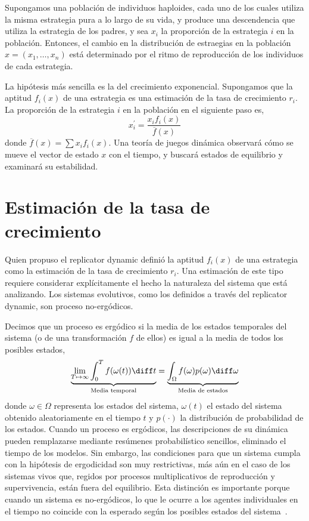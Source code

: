 \documentclass[a4paper,10pt]{article}
\begin{document}
Supongamos una población de individuos haploides, cada uno de los cuales utiliza la misma estrategia pura a lo largo de su vida, y produce una descendencia que utiliza la estrategia de los padres, y sea $x_i$ la proporción de la estrategia $i$ en la población.
Entonces, el cambio en la distribución de estraegias en la población $x = (x_1 , \dots , x_n)$ está determinado por el ritmo de reproducción de los individuos de cada estrategia.

La hipótesis más sencilla es la del crecimiento exponencial.
Supongamos que la aptitud $f_i(x)$ de una estrategia es una estimación de la tasa de crecimiento $r_i$.
La proporción de la estrategia $i$ en la población en el siguiente paso es,    
\begin{equation}
x_i^\prime = \frac{x_i f_i(x)}{\overline{f}(x)}
\end{equation}
donde $\overline{f}(x)=\sum x_i f_i(x)$.
Una teoría de juegos dinámica observará cómo se mueve el vector de estado $x$ con el tiempo, y buscará estados de equilibrio y examinará su estabilidad.

\section{Estimación de la tasa de crecimiento}

Quien propuso el replicator dynamic definió la aptitud $f_i(x)$ de una estrategia como la estimación de la tasa de crecimiento $r_i$.
Una estimación de este tipo requiere considerar explícitamente el hecho la naturaleza del sistema que está analizando. 
Los sistemas evolutivos, como los definidos a través del replicator dynamic, son proceso no-ergódicos.

Decimos que un proceso es ergódico si la media de los estados temporales del sistema (o de una transformación $f$ de ellos) es igual a la media de todos los posibles estados,
\begin{equation}
 \underbrace{\lim_{T \mapsto \infty} \int_0^T f(\omega(t)) \diff t}_{\text{Media temporal}}  = \underbrace{\int_{\Omega} f(\omega)p(\omega) \diff\omega}_{\text{Media de estados}}
\end{equation}
donde $\omega \in \Omega$ representa los estados del sistema, $\omega(t)$ el estado del sistema obtenido aleatoriamente en el tiempo $t$ y $p(\cdot)$ la distribución de probabilidad de los estados.
Cuando un proceso es ergódicos, las descripciones de su dinámica pueden remplazarse mediante resúmenes probabilístico sencillos, eliminado el tiempo de los modelos.
Sin embargo, las condiciones para que un sistema cumpla con la hipótesis de ergodicidad son muy restrictivas, más aún en el caso de los sistemas vivos que, regidos por procesos multiplicativos de reproducción y supervivencia, están fuera del equilibrio.
Esta distinción es importante porque cuando un sistema es no-ergódicos, lo que le ocurre a los agentes individuales en el tiempo no coincide con la esperado según los posibles estados del sistema~\cite{peters2019-ergodicityEconomics}.
\end{document}
